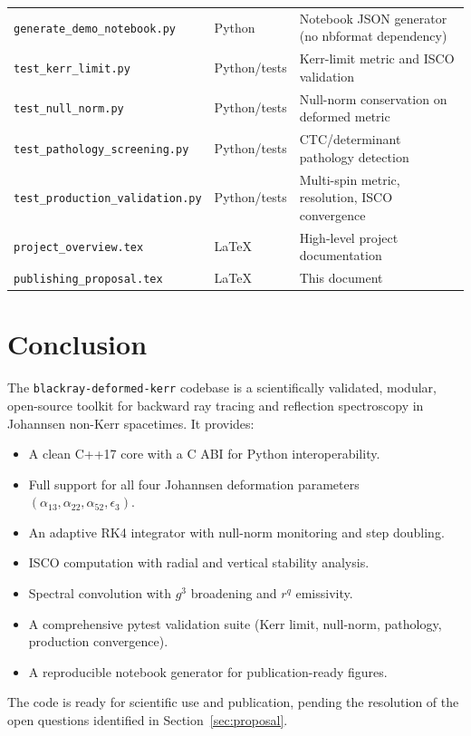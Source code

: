 \documentclass[11pt,twoside]{article}
\begin{document}
\begin{longtable}{>{\ttfamily}p{3.5cm}p{2cm}p{5cm}}
\texttt{generate\_demo\_notebook.py} & Python & Notebook JSON generator (no nbformat dependency) \\
\texttt{test\_kerr\_limit.py}    & Python/tests & Kerr-limit metric and ISCO validation \\
\texttt{test\_null\_norm.py}     & Python/tests & Null-norm conservation on deformed metric \\
\texttt{test\_pathology\_screening.py} & Python/tests & CTC/determinant pathology detection \\
\texttt{test\_production\_validation.py} & Python/tests & Multi-spin metric, resolution, ISCO convergence \\
\texttt{project\_overview.tex} & LaTeX        & High-level project documentation \\
\texttt{publishing\_proposal.tex} & LaTeX    & This document \\
\end{longtable}

\section{Conclusion}

The \texttt{blackray-deformed-kerr} codebase is a scientifically validated,
modular, open-source toolkit for backward ray tracing and reflection
spectroscopy in Johannsen non-Kerr spacetimes. It provides:

\begin{itemize}
\item A clean C++17 core with a C ABI for Python interoperability.
\item Full support for all four Johannsen deformation parameters
$(\alpha_{13}, \alpha_{22}, \alpha_{52}, \epsilon_3)$.
\item An adaptive RK4 integrator with null-norm monitoring and step doubling.
\item ISCO computation with radial and vertical stability analysis.
\item Spectral convolution with $g^3$ broadening and $r^q$ emissivity.
\item A comprehensive pytest validation suite (Kerr limit, null-norm,
pathology, production convergence).
\item A reproducible notebook generator for publication-ready figures.
\end{itemize}

The code is ready for scientific use and publication, pending the resolution
of the open questions identified in Section~\ref{sec:proposal}.
\\



\end{document}

